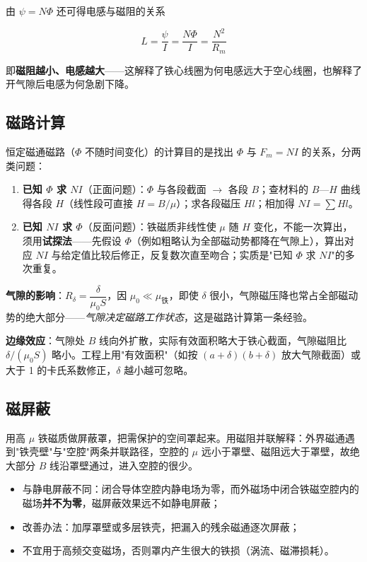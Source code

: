 由 $\psi=N\Phi$ 还可得电感与磁阻的关系
\begin{formulaBox}
\[
L=\frac{\psi}{I}=\frac{N\Phi}{I}=\frac{N^2}{R_m}
\]
\end{formulaBox}
即\textbf{磁阻越小、电感越大}——这解释了铁心线圈为何电感远大于空心线圈，也解释了开气隙后电感为何急剧下降。

\subsection{磁路计算}
恒定磁通磁路（$\Phi$ 不随时间变化）的计算目的是找出 $\Phi$ 与 $F_m=NI$ 的关系，分两类问题：
\begin{enumerate}
  \item \textbf{已知 $\Phi$ 求 $NI$}（正面问题）：$\Phi$ 与各段截面 $\to$ 各段 $B$；查材料的 $B$—$H$ 曲线得各段 $H$（线性段可直接 $H=B/\mu$）；求各段磁压 $Hl$；相加得 $NI=\sum Hl$。
  \item \textbf{已知 $NI$ 求 $\Phi$}（反面问题）：铁磁质非线性使 $\mu$ 随 $H$ 变化，不能一次算出，须用\textbf{试探法}——先假设 $\Phi$（例如粗略认为全部磁动势都降在气隙上），算出对应 $NI$ 与给定值比较后修正，反复数次直至吻合；实质是"已知 $\Phi$ 求 $NI$"的多次重复。
\end{enumerate}
\textbf{气隙的影响}：$R_\delta=\dfrac{\delta}{\mu_0 S}$，因 $\mu_0\ll\mu_{\text{铁}}$，即使 $\delta$ 很小，气隙磁压降也常占全部磁动势的绝大部分——\emph{气隙决定磁路工作状态}，这是磁路计算第一条经验。

\textbf{边缘效应}：气隙处 $B$ 线向外扩散，实际有效面积略大于铁心截面，气隙磁阻比 $\delta/(\mu_0S)$ 略小。工程上用"有效面积"（如按 $(a+\delta)(b+\delta)$ 放大气隙截面）或大于 1 的卡氏系数修正，$\delta$ 越小越可忽略。

\subsection{磁屏蔽}
用高 $\mu$ 铁磁质做屏蔽罩，把需保护的空间罩起来。用磁阻并联解释：外界磁通遇到"铁壳壁"与"空腔"两条并联路径，空腔的 $\mu$ 远小于罩壁、磁阻远大于罩壁，故绝大部分 $B$ 线沿罩壁通过，进入空腔的很少。

\begin{itemize}
  \item 与静电屏蔽不同：闭合导体空腔内静电场为零，而外磁场中闭合铁磁空腔内的磁场\textbf{并不为零}，磁屏蔽效果远不如静电屏蔽；
  \item 改善办法：加厚罩壁或多层铁壳，把漏入的残余磁通逐次屏蔽；
  \item 不宜用于高频交变磁场，否则罩内产生很大的铁损（涡流、磁滞损耗）。
\end{itemize}

